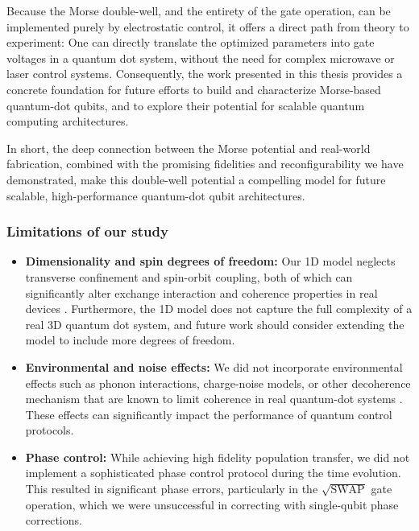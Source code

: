 \documentclass{subfiles}
\begin{document}
Because the Morse double-well, and the entirety of the gate operation, can be implemented purely by electrostatic control, it offers a direct path from theory to experiment: One can directly translate the optimized parameters into gate voltages in a quantum dot system, without the need for complex microwave or laser control systems. Consequently, the work presented in this thesis provides a concrete foundation for future efforts to build and characterize Morse-based quantum-dot qubits, and to explore their potential for scalable quantum computing architectures. 

In short, the deep connection between the Morse potential and real-world fabrication, combined with the promising fidelities and reconfigurability we have demonstrated, make this double-well potential a compelling model for future scalable, high-performance quantum-dot qubit architectures. 

\subsubsection*{Limitations of our study}
\begin{itemize}
    \item \textbf{Dimensionality and spin degrees of freedom:} Our 1D model neglects transverse confinement and spin-orbit coupling, both of which can significantly alter exchange interaction and coherence properties in real devices \cite{kuhlmann2013charge, yoneda2018quantum}. Furthermore, the 1D model does not capture the full complexity of a real 3D quantum dot system, and future work should consider extending the model to include more degrees of freedom.
    \item \textbf{Environmental and noise effects:} We did not incorporate environmental effects such as phonon interactions, charge-noise models, or other decoherence mechanism that are known to limit coherence in real quantum-dot systems \cite{jacak2013quantum, nielsen2010quantum}. These effects can significantly impact the performance of quantum control protocols.
    \item \textbf{Phase control:} While achieving high fidelity population transfer, we did not implement a sophisticated phase control protocol during the time evolution. This resulted in significant phase errors, particularly in the $\sqrt{\text{SWAP}}$ gate operation, which we were unsuccessful in correcting with single-qubit phase corrections. 
\end{itemize}
\end{document}

